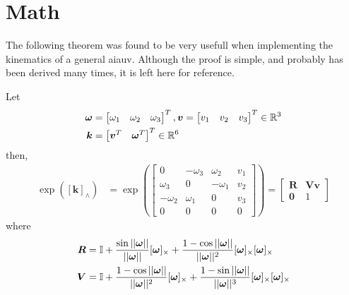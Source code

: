 \chapter{Math}

The following theorem was found to be very usefull when implementing the kinematics
of a general \gls{aiauv}. Although the proof is simple, and probably has been
derived many times, it is left here for reference.
\begin{theorem}
Let
\begin{subequations}
\begin{align}
\bm{\omega} &= \begin{bmatrix}\omega_1 & \omega_2 & \omega_3 \end{bmatrix}^T,
\bm{v} = \begin{bmatrix}v_1 & v_2 & v_3 \end{bmatrix}^T \in \mathbb{R}^3 \\
\bm{k} &= \begin{bmatrix}\bm{v}^T & \bm{\omega}^T\end{bmatrix}^T \in \mathbb{R}^6
\end{align}
\end{subequations}
then,
\begin{subequations}
\begin{align}
    \exp{\left([\bm{k}]_{\wedge}\right)} &= 
    \exp{\left(\begin{bmatrix}
        0 & -\omega_3 & \omega_2 & v_1 \\
        \omega_3 & 0 & -\omega_1 & v_2 \\
        -\omega_2 & \omega_1 & 0 & v_3 \\
        0 & 0 & 0 & 0
    \end{bmatrix} \right)} = \begin{bmatrix}
        \bm{R} & \bm{V}\bm{v} \\
        \bm{0} & 1
    \end{bmatrix}
\end{align}
\end{subequations}
where
\begin{subequations}
\begin{align}
    \bm{R} &= \mathbb{I}
    + \frac{\sin{||\bm{\omega}||}}{||\bm{\omega}||}[\bm{\omega}]_{\times}
    + \frac{1-\cos{||\bm{\omega}||}}{||\bm{\omega}||^2}
       [\bm{\omega}]_{\times}[\bm{\omega}]_{\times} \\
    \bm{V} &= \mathbb{I}
    + \frac{1-\cos||\bm{\omega}||}{||\bm{\omega}||^2}[\bm{\omega}]_{\times}
    + \frac{1-\sin||\bm{\omega}||}{||\bm{\omega}||^3}[\bm{\omega}]_{\times}[\bm{\omega}]_{\times}
\end{align}
\end{subequations}
\end{theorem}

